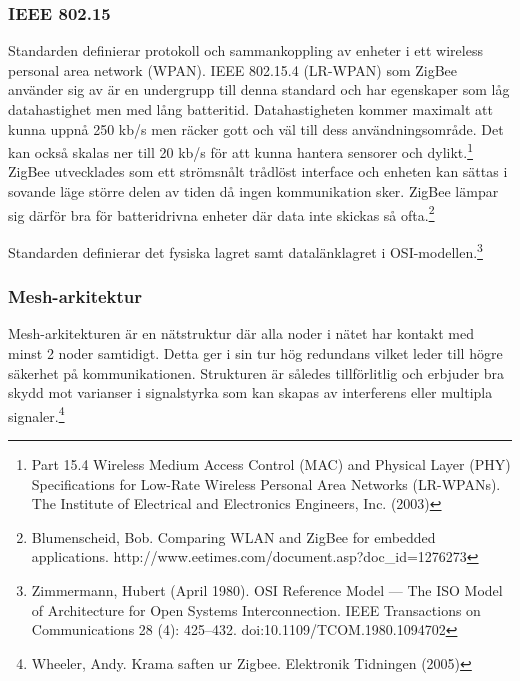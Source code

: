 \documentclass[a4paper,12pt,fleqn]{article}
\begin{document}
\subsubsection{IEEE 802.15}
Standarden definierar protokoll och sammankoppling av enheter i ett wireless personal area network (WPAN). IEEE 802.15.4 (LR-WPAN) som ZigBee använder sig av är en undergrupp till denna standard och har egenskaper som låg datahastighet men med lång batteritid. Datahastigheten kommer maximalt att kunna uppnå 250 kb/s men räcker gott och väl till dess användningsområde. Det kan också skalas ner till 20 kb/s för att kunna hantera sensorer och dylikt.\footnote{\label{IEEE} Part 15.4 Wireless Medium Access Control (MAC) and Physical Layer (PHY) Specifications for Low-Rate Wireless Personal Area Networks (LR-WPANs). The Institute of Electrical and Electronics Engineers, Inc. (2003)} ZigBee utvecklades som ett strömsnålt trådlöst interface och enheten kan sättas i sovande läge större delen av tiden då ingen kommunikation sker. ZigBee lämpar sig därför bra för batteridrivna enheter där data inte skickas så ofta.\footnote{Blumenscheid, Bob. Comparing WLAN and ZigBee for embedded applications. http://www.eetimes.com/document.asp?doc\_id=1276273} 

Standarden definierar det fysiska lagret samt datalänklagret i OSI-modellen.\footnote{Zimmermann, Hubert (April 1980). OSI Reference Model — The ISO Model of Architecture for Open Systems Interconnection. IEEE Transactions on Communications 28 (4): 425–432. doi:10.1109/TCOM.1980.1094702} 


\subsubsection{Mesh-arkitektur}
Mesh-arkitekturen är en nätstruktur där alla noder i nätet har kontakt med minst 2 noder samtidigt. Detta ger i sin tur hög redundans vilket leder till högre säkerhet på kommunikationen. Strukturen är således tillförlitlig och erbjuder bra skydd mot varianser i signalstyrka som kan skapas av interferens eller multipla signaler.\footnote{\label{eltidning} Wheeler, Andy. Krama saften ur Zigbee. Elektronik Tidningen (2005)}
\end{document}
